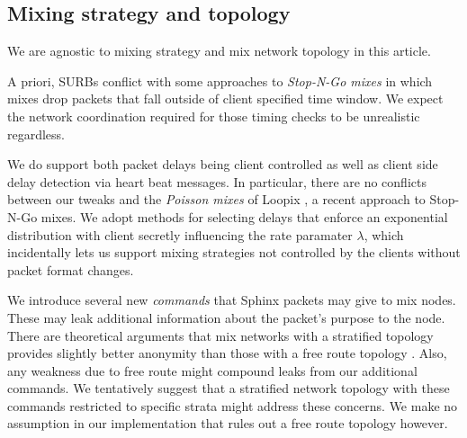 \subsection{Mixing strategy and topology}

We are agnostic to mixing strategy and mix network topology in this
article. 

A priori, SURBs conflict with some approaches to {\em Stop-N-Go mixes}
\cite{StopNGo} in which mixes drop packets that fall outside of client
specified time window.  We expect the network coordination required
for those timing checks to be unrealistic regardless. 

We do support both packet delays being client controlled as well as
client side delay detection via heart beat messages.  In particular,
there are no conflicts between our tweaks and the {\em Poisson mixes}
of Loopix \cite{Loopix}, a recent approach to Stop-N-Go mixes.
We adopt methods for selecting delays that enforce an exponential
distribution with client secretly influencing the rate paramater
$\lambda$, which incidentally lets us support mixing strategies not
controlled by the clients without packet format changes.

We introduce several new {\em commands} that Sphinx packets may give
to mix nodes.  These may leak additional information about the
packet's purpose to the node.  There are theoretical arguments that 
mix networks with a stratified topology provides slightly better
anonymity than those with a free route topology \cite{Diaz-??}.  
Also, any weakness due to free route might compound leaks from our
additional commands.  We tentatively suggest that a stratified
network topology with these commands restricted to specific strata
might address these concerns. %
We make no assumption in our implementation that rules out a free
route topology however.  



